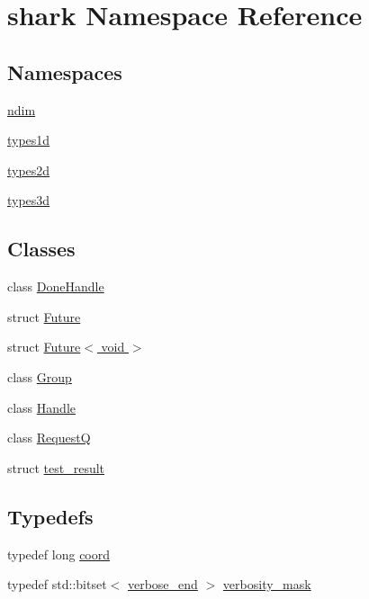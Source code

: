 \hypertarget{namespaceshark}{}\section{shark Namespace Reference}
\label{namespaceshark}
\subsection*{Namespaces}
\begin{DoxyCompactItemize}
\item 
 \hyperlink{namespaceshark_1_1ndim}{ndim}
\item 
 \hyperlink{namespaceshark_1_1types1d}{types1d}
\item 
 \hyperlink{namespaceshark_1_1types2d}{types2d}
\item 
 \hyperlink{namespaceshark_1_1types3d}{types3d}
\end{DoxyCompactItemize}
\subsection*{Classes}
\begin{DoxyCompactItemize}
\item 
class \hyperlink{classshark_1_1_done_handle}{Done\+Handle}
\item 
struct \hyperlink{structshark_1_1_future}{Future}
\item 
struct \hyperlink{structshark_1_1_future_3_01void_01_4}{Future$<$ void $>$}
\item 
class \hyperlink{classshark_1_1_group}{Group}
\item 
class \hyperlink{classshark_1_1_handle}{Handle}
\item 
class \hyperlink{classshark_1_1_request_q}{RequestQ}
\item 
struct \hyperlink{structshark_1_1test__result}{test\+\_\+result}
\end{DoxyCompactItemize}
\subsection*{Typedefs}
\begin{DoxyCompactItemize}
\item 
typedef long \hyperlink{namespaceshark_a767a92d5dd82cb82266473bff42fa6d9}{coord}
\item 
typedef std\+::bitset$<$ \hyperlink{namespaceshark_a0603d8d658beed6e7e3fc44471f5c04f}{verbose\+\_\+end} $>$ \hyperlink{namespaceshark_a882c3e22f3e4476cf4a95f34a42e27eb}{verbosity\+\_\+mask}
\end{DoxyCompactItemize}
